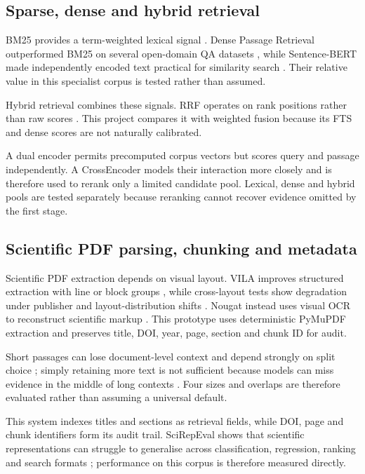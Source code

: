 \documentclass[11pt,a4paper]{article}
\begin{document}
\subsection{Sparse, dense and hybrid retrieval}
\label{sec:sparse-dense-and-hybrid-retrieval}

BM25 provides a term-weighted lexical signal \cite{robertson2009bm25}. Dense Passage Retrieval outperformed BM25 on several open-domain QA datasets \cite{karpukhin2020dpr}, while Sentence-BERT made independently encoded text practical for similarity search \cite{reimers2019sbert}. Their relative value in this specialist corpus is tested rather than assumed.

Hybrid retrieval combines these signals. RRF operates on rank positions rather than raw scores \cite{cormack2009rrf}. This project compares it with weighted fusion because its FTS and dense scores are not naturally calibrated.

A dual encoder permits precomputed corpus vectors but scores query and passage independently. A CrossEncoder models their interaction more closely and is therefore used to rerank only a limited candidate pool. Lexical, dense and hybrid pools are tested separately because reranking cannot recover evidence omitted by the first stage.

\subsection{Scientific PDF parsing, chunking and metadata}
\label{sec:scientific-pdf-parsing-chunking-and-metadata}

Scientific PDF extraction depends on visual layout. VILA improves structured extraction with line or block groups \cite{shen2022vila}, while cross-layout tests show degradation under publisher and layout-distribution shifts \cite{chen2023layout}. Nougat instead uses visual OCR to reconstruct scientific markup \cite{blecher2023nougat}. This prototype uses deterministic PyMuPDF extraction and preserves title, DOI, year, page, section and chunk ID for audit.

Short passages can lose document-level context and depend strongly on split choice \cite{liu2021dense}; simply retaining more text is not sufficient because models can miss evidence in the middle of long contexts \cite{liu2024lost}. Four sizes and overlaps are therefore evaluated rather than assuming a universal default.

This system indexes titles and sections as retrieval fields, while DOI, page and chunk identifiers form its audit trail. SciRepEval shows that scientific representations can struggle to generalise across classification, regression, ranking and search formats \cite{singh2023scirepeval}; performance on this corpus is therefore measured directly.
\end{document}
